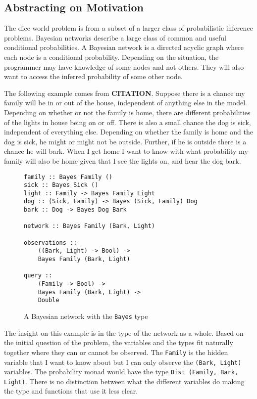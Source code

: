 \documentclass[10pt,twocolumn]{article}
\begin{document}
\subsection{Abstracting on Motivation}
The dice world problem is from a subset of a larger class of probabilistic inference problems. Bayesian networks describe a large class of common and useful conditional probabilities. A Bayesian network is a directed acyclic graph where each node is a conditional probability. Depending on the situation, the programmer may have knowledge of some nodes and not others. They will also want to access the inferred probability of some other node.

The following example comes from \textbf{CITATION}. Suppose there is a chance my family will be in or out of the house, independent of anything else in the model. Depending on whether or not the family is home, there are different probabilities of the lights in house being on or off. There is also a small chance the dog is sick, independent of everything else. Depending on whether the family is home and the dog is sick, he might or might not be outside. Further, if he is outside there is a chance he will bark. When I get home I want to know with what probability my family will also be home given that I see the lights on, and hear the dog bark.

\begin{figure}[H]
\begin{verbatim}
family :: Bayes Family ()
sick :: Bayes Sick ()
light :: Family -> Bayes Family Light
dog :: (Sick, Family) -> Bayes (Sick, Family) Dog
bark :: Dog -> Bayes Dog Bark

network :: Bayes Family (Bark, Light)

observations ::
    ((Bark, Light) -> Bool) ->
    Bayes Family (Bark, Light)

query ::
    (Family -> Bool) ->
    Bayes Family (Bark, Light) ->
    Double
\end{verbatim}
\caption{A Bayesian network with the \texttt{Bayes} type}
\end{figure}

The insight on this example is in the type of the network as a whole. Based on the initial question of the problem, the variables and the types fit naturally together where they can or cannot be observed. The \texttt{Family} is the hidden variable that I want to know about but I can only observe the \texttt{(Bark, Light)} variables. The probability monad would have the type \texttt{Dist (Family, Bark, Light)}. There is no distinction between what the different variables do making the type and functions that use it less clear.
\end{document}
